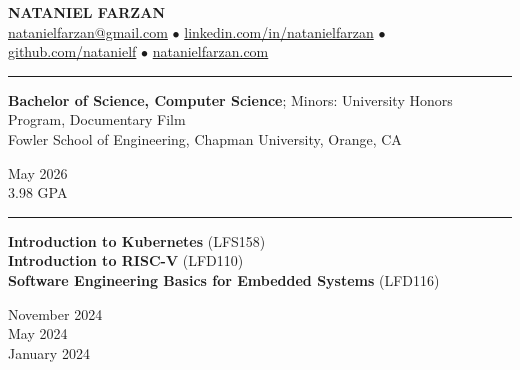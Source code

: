 \documentclass[letter]{article}
\begin{document}
    \begin{center}
        {\huge \textbf{\uppercase{Nataniel Farzan}}} \\
        \href{mailto:natanielfarzan@gmail.com}{natanielfarzan@gmail.com} $\bullet$
        \href{https://www.linkedin.com/in/natanielfarzan}{linkedin.com/in/natanielfarzan} $\bullet$
        \href{https://github.com/natanielf}{github.com/natanielf} $\bullet$
        \href{https://natanielfarzan.com/}{natanielfarzan.com}
    \end{center}

    \vspace{4pt}
    \hrule height 1pt
    \vspace{4pt}
    \noindent
    \begin{minipage}[c]{0.89\linewidth}
        \noindent \textbf{Bachelor of Science, Computer Science}; Minors: University Honors Program, Documentary Film \\
        \noindent Fowler School of Engineering, Chapman University, Orange, CA \\
    \end{minipage}
    \begin{minipage}[c]{0.10\linewidth}
        \vspace*{-\baselineskip}
        \begin{flushright}
            May 2026 \\
            3.98 GPA \\
        \end{flushright}
    \end{minipage}

    \vspace{4pt}
    \hrule height 1pt
    \vspace{4pt}
    \noindent
    \begin{minipage}[c]{0.7\linewidth}
        \noindent \textbf{Introduction to Kubernetes} (LFS158) \\
        \noindent \textbf{Introduction to RISC-V} (LFD110) \\
        \noindent \textbf{Software Engineering Basics for Embedded Systems} (LFD116) \\
    \end{minipage}
    \begin{minipage}[c]{0.29\linewidth}
        \vspace*{-\baselineskip}
        \begin{flushright}
            November 2024 \\
            May 2024 \\
            January 2024 \\
        \end{flushright}
    \end{minipage}
\end{document}

